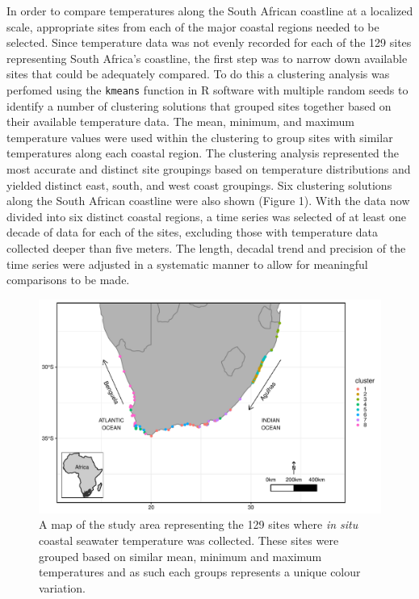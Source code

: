 \documentclass[12pt,A4paper,]{article}
\begin{document}
In order to compare temperatures along the South African coastline at a
localized scale, appropriate sites from each of the major coastal
regions needed to be selected. Since temperature data was not evenly
recorded for each of the 129 sites representing South Africa's
coastline, the first step was to narrow down available sites that could
be adequately compared. To do this a clustering analysis was perfomed
using the \texttt{kmeans} function in R software with multiple random
seeds to identify a number of clustering solutions that grouped sites
together based on their available temperature data. The mean, minimum,
and maximum temperature values were used within the clustering to group
sites with similar temperatures along each coastal region. The
clustering analysis represented the most accurate and distinct site
groupings based on temperature distributions and yielded distinct east,
south, and west coast groupings. Six clustering solutions along the
South African coastline were also shown (Figure 1). With the data now
divided into six distinct coastal regions, a time series was selected of
at least one decade of data for each of the sites, excluding those with
temperature data collected deeper than five meters. The length, decadal
trend and precision of the time series were adjusted in a systematic
manner to allow for meaningful comparisons to be made.

\begin{figure}
\centering
\includegraphics{../figures/map_fixed.pdf}
\caption{A map of the study area representing the 129 sites where
\emph{in situ} coastal seawater temperature was collected. These sites
were grouped based on similar mean, minimum and maximum temperatures and
as such each groups represents a unique colour variation.}
\end{figure}
\end{document}
